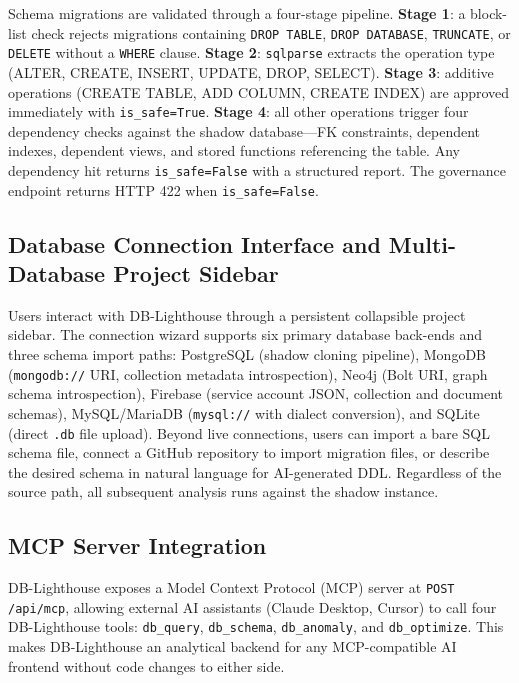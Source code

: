 \documentclass[conference]{IEEEtran}
\begin{document}
Schema migrations are validated through a four-stage pipeline.
\textbf{Stage 1}: a block-list check rejects migrations containing
\texttt{DROP TABLE}, \texttt{DROP DATABASE}, \texttt{TRUNCATE}, or
\texttt{DELETE} without a \texttt{WHERE} clause.
\textbf{Stage 2}: \texttt{sqlparse} extracts the operation type (ALTER,
CREATE, INSERT, UPDATE, DROP, SELECT).
\textbf{Stage 3}: additive operations (CREATE TABLE, ADD COLUMN, CREATE
INDEX) are approved immediately with \texttt{is\_safe=True}.
\textbf{Stage 4}: all other operations trigger four dependency checks
against the shadow database---FK constraints, dependent indexes, dependent
views, and stored functions referencing the table. Any dependency hit
returns \texttt{is\_safe=False} with a structured report. The governance
endpoint returns HTTP 422 when \texttt{is\_safe=False}.

\subsection{Database Connection Interface and Multi-Database Project Sidebar}

Users interact with DB-Lighthouse through a persistent collapsible
project sidebar. The connection wizard supports six primary database
back-ends and three schema import paths: PostgreSQL (shadow cloning
pipeline), MongoDB (\texttt{mongodb://} URI, collection metadata
introspection), Neo4j (Bolt URI, graph schema introspection), Firebase
(service account JSON, collection and document schemas), MySQL/MariaDB
(\texttt{mysql://} with dialect conversion), and SQLite (direct
\texttt{.db} file upload). Beyond live connections, users can import a
bare SQL schema file, connect a GitHub repository to import migration
files, or describe the desired schema in natural language for AI-generated
DDL. Regardless of the source path, all subsequent analysis runs against
the shadow instance.

\subsection{MCP Server Integration}

DB-Lighthouse exposes a Model Context Protocol (MCP) server at
\texttt{POST /api/mcp}, allowing external AI assistants (Claude Desktop,
Cursor) to call four DB-Lighthouse tools: \texttt{db\_query},
\texttt{db\_schema}, \texttt{db\_anomaly}, and \texttt{db\_optimize}. This
makes DB-Lighthouse an analytical backend for any MCP-compatible AI
frontend without code changes to either side.
\end{document}
